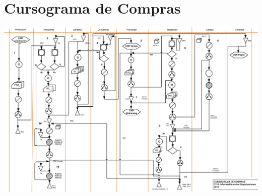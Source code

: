 \pagebreak
\section{Cursograma de Compras}
\includegraphics [scale=0.5 ,angle=90]{Empresa/Circuitos/Compras/Compras-Procedimiento.png}

\pagebreak
